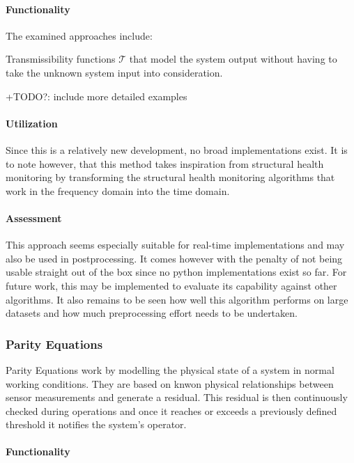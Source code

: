 \paragraph{Functionality}


The examined approaches include:

Transmissibility functions $\mathcal{T}$ that model the system output without having to take the unknown system input into consideration.

+TODO?: include more detailed examples

\paragraph{Utilization}
Since this is a relatively new development, no broad implementations exist. It is to note however, that this method takes inspiration from structural health monitoring by transforming the structural health monitoring algorithms that work in the frequency domain into the time domain.

\paragraph{Assessment}

This approach seems especially suitable for real-time implementations and may also be used in postprocessing. It comes however with the penalty of not being usable straight out of the box since no python implementations exist so far. For future work, this may be implemented to evaluate its capability against other algorithms. It also remains to be seen how well this algorithm performs on large datasets and how much preprocessing effort needs to be undertaken.

\subsubsection{Parity Equations}

Parity Equations work by modelling the physical state of a system in normal working conditions. They are based on knwon physical relationships between sensor measurements and generate a residual. This residual is then continuously checked during operations and once it reaches or exceeds a previously defined threshold it notifies the system's operator. \cite{isermann_fault-diagnosis_2011}

\paragraph{Functionality}

